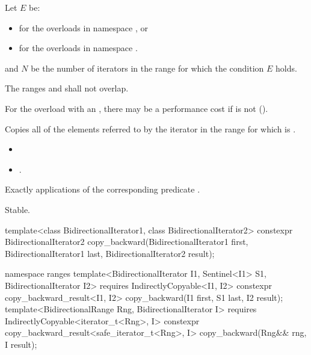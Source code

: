 \begin{itemdescr}
\pnum
\begin{addedblock}
Let $E$ be:
\begin{itemize}
\item {} for the overloads in namespace , or
\item {} for the overloads in
  namespace .
\end{itemize}
and $N$ be the number of iterators  in the range 
for which the condition $E$ holds.
\end{addedblock}

\pnum
\requires The ranges
and
shall not overlap.
\begin{note}
For the overload with an , there may be a performance
cost if  is not
 ().
\end{note}

\pnum
\effects Copies all of the elements referred to by the iterator 
in the range  for which  is
.

\pnum
\returns {}
\begin{itemize}
\item {}
\item {}.
\end{itemize}

\pnum
\complexity
Exactly  applications of the corresponding predicate
.

\pnum
\remarks Stable.
\end{itemdescr}

%
\begin{itemdecl}
template<class BidirectionalIterator1, class BidirectionalIterator2>
  constexpr BidirectionalIterator2
    copy_backward(BidirectionalIterator1 first,
                  BidirectionalIterator1 last,
                  BidirectionalIterator2 result);
\end{itemdecl}\begin{addedblock}\begin{itemdecl}
namespace ranges {
  template<BidirectionalIterator I1, Sentinel<I1> S1, BidirectionalIterator I2>
    requires IndirectlyCopyable<I1, I2>
    constexpr copy_backward_result<I1, I2>
      copy_backward(I1 first, S1 last, I2 result);
  template<BidirectionalRange Rng, BidirectionalIterator I>
    requires IndirectlyCopyable<iterator_t<Rng>, I>
    constexpr copy_backward_result<safe_iterator_t<Rng>, I>
      copy_backward(Rng&& rng, I result);
}
\end{itemdecl}\end{addedblock}

